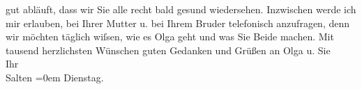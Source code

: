 \begin{ledgroupsized}[t]{13cm}
               gut abläuft, dass wir Sie alle recht bald gesund wiedersehen. Inzwischen werde ich
               mir erlauben, bei Ihrer Mutter u. bei
               Ihrem Bruder telefonisch anzufragen,
               denn wir möchten täglich wiſsen, wie es Olga
               geht und was Sie Beide machen. \pend
           \pstart
           Mit tausend herzlichsten Wünschen guten Gedanken und Grüßen an Olga u. Sie
               {\\[\baselineskip]}Ihr
               {\\[\baselineskip]}\spacefill\mbox{Salten}\pend
           \leftskip=0em{}\pstart
           Dienstag.\pend
           
         
         \endnumbering{}\end{ledgroupsized}\begin{anhang}\end{anhang}\newcommand{\dateiname}{L03494}\newcommand{\titel}{Felix Salten an Arthur Schnitzler, [10. 12. 1907]}\newcommand{\editorInnen}{Martin Anton Müller und Laura Untner}
      